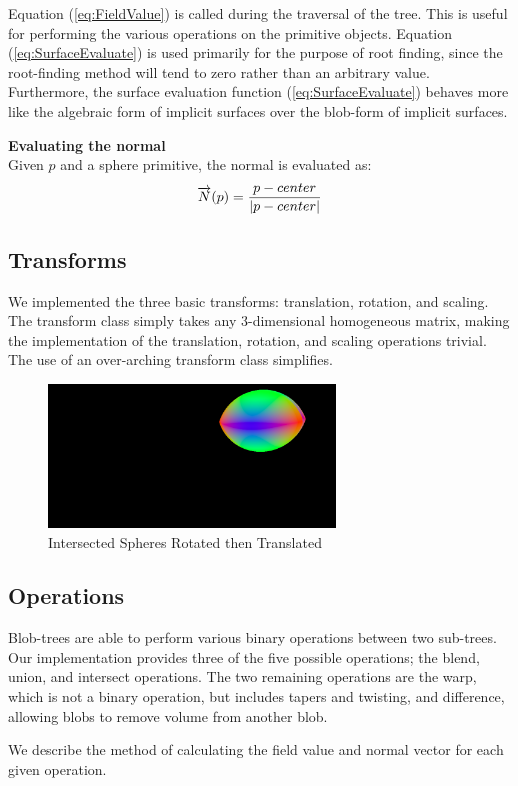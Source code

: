 \documentclass[conference]{acmsiggraph}
\begin{document}
Equation  (\ref{eq:FieldValue}) is called during the traversal of the tree. This
is useful for performing the various operations on the primitive objects.
Equation (\ref{eq:SurfaceEvaluate}) is used primarily for the purpose of root
finding, since the root-finding method will tend to zero rather than an
arbitrary value. Furthermore, the surface evaluation function
(\ref{eq:SurfaceEvaluate}) behaves more like the algebraic form of implicit
surfaces over the blob-form of implicit surfaces.


\textbf{Evaluating the normal}\\
Given $p$ and a sphere primitive, the normal is evaluated as:
$$ \overrightarrow{N}(p) = {p - center \over \lvert p - center \rvert}$$

\subsection{Transforms}
We implemented the three basic transforms: translation, rotation, and scaling.
The transform class simply takes any 3-dimensional homogeneous matrix, making
the implementation of the translation, rotation, and scaling operations
trivial. The use of an over-arching transform class simplifies.

\begin{figure}[htb]
	\centering
	\includegraphics[height=1.5in]{images/intersect_rotate.png}
	\caption{Intersected Spheres Rotated then Translated}
\end{figure}

\subsection{Operations}
Blob-trees are able to perform various binary operations between two
sub-trees. Our implementation provides three of the five possible operations;
the blend, union, and intersect operations. The two remaining operations are
the warp, which is not a binary operation, but includes tapers and twisting,
and difference, allowing blobs to remove volume from another blob.

We describe the method of calculating the field value and normal vector for
each given operation.
\end{document}
